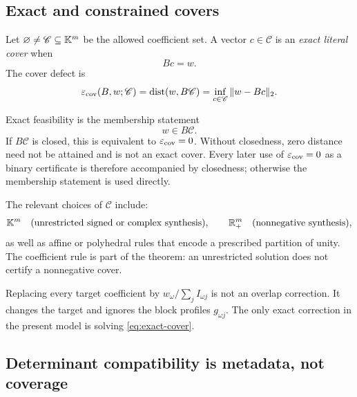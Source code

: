 \subsection{Exact and constrained covers}

\begin{definition}
\label{def:literal-cover}
Let \(\varnothing\ne\mathscr C\subseteq\mathbb K^m\) be the allowed
coefficient set.  A vector \(c\in\mathscr C\) is an
\emph{exact literal cover} when
\begin{equation}
 Bc=w.
 \label{eq:exact-cover}
\end{equation}
The cover defect is
\begin{equation}
 \varepsilon_{\mathrm{cov}}(B,w;\mathscr C)
 =
 \operatorname{dist}(w,B\mathscr C)
 =
 \inf_{c\in\mathscr C}\|w-Bc\|_2.
 \label{eq:cover-defect}
\end{equation}
\end{definition}

\begin{remark}
\label{rem:membership-vs-distance}
Exact feasibility is the membership statement
\[
 w\in B\mathscr C.
\]
If \(B\mathscr C\) is closed, this is equivalent to
\(\varepsilon_{\mathrm{cov}}=0\).  Without closedness, zero distance need not be
attained and is not an exact cover.  Every later use of
\(\varepsilon_{\mathrm{cov}}=0\) as a binary certificate is therefore accompanied by
closedness; otherwise the membership statement is used directly.
\end{remark}

The relevant choices of \(\mathscr C\) include:
\[
 \mathbb K^m
 \quad\text{(unrestricted signed or complex synthesis)},\qquad
 \mathbb R_+^m
 \quad\text{(nonnegative synthesis)},
\]
as well as affine or polyhedral rules that encode a prescribed
partition of unity.  The coefficient rule is part of the theorem:
an unrestricted solution does not certify a nonnegative cover.

\begin{remark}
\label{rem:no-multiplicity-division}
Replacing every target coefficient by
\(w_\omega/\sum_jI_{\omega j}\) is not an overlap correction.  It
changes the target and ignores the block profiles \(g_{\omega j}\).
The only exact correction in the present model is solving
\eqref{eq:exact-cover}.
\end{remark}

\subsection{Determinant compatibility is metadata, not coverage}

